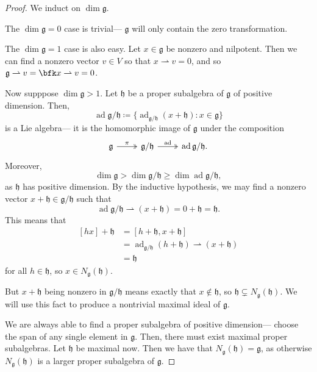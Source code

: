 \documentclass{article}
\newcommand{\lb}[1]{\ensuremath{\left[{#1}\right]}}
\DeclareMathOperator{\ad}{ad}
\newcommand*\frkg{{\ensuremath{\mathfrak{g}}}}
\newcommand*\frkh{{\ensuremath{\mathfrak{h}}}}
\begin{document}
\begin{proof}
    We induct on $\dim \frkg$.

    The $\dim \frkg = 0$ case is trivial--- $\frkg$ will only contain the zero transformation.

    The $\dim \frkg = 1$ case is also easy.
    Let $x \in \frkg$ be nonzero and nilpotent.
    Then  we can find a nonzero vector $v \in V$ so that $x \rightharpoonup v = 0$, and so $\frkg \rightharpoonup v = \bfk x \rightharpoonup v = 0$.

    Now supppose $\dim \frkg > 1$.
    Let $\frkh$ be a proper subalgebra of $\frkg$ of positive dimension.
    Then,
    \[
        \ad \frkg/\frkh
        \coloneq
        \Big\{
            \ad_{\frkg/\frkh}(x + \frkh)
            :
            x \in \frkg
        \Big\}
    \]
    is a Lie algebra--- it is the homomorphic image of $\frkg$ under the composition
    \[
        \begin{tikzcd}
            \frkg \arrow[r, "\pi", two heads] & \frkg/\frkh \arrow[r, "\ad", two heads] & \ad \frkg/\frkh. 
        \end{tikzcd}
    \]
    Moreover, 
    \[
        \dim \frkg > \dim \frkg/\frkh \geq \dim \ad \frkg/\frkh,
    \]
    as $\frkh$ has positive dimension.
    By the inductive hypothesis, we may find a nonzero vector $x + \frkh \in \frkg/\frkh$ such that
    \[
        \ad \frkg/\frkh \rightharpoonup (x + \frkh) 
        = 
        0 + \frkh = \frkh.
    \]
    This means that
    \begin{align*}
        \lb{hx} + \frkh
        &=
        \lb{h + \frkh, x + \frkh}
        \\
        &=
        \ad_{\frkg/\frkh} (h + \frkh) \rightharpoonup (x + \frkh) 
        \\
        &= 
        \frkh
    \end{align*}
    for all $h \in \frkh$, so $x \in N_\frkg(\frkh)$.

    But $x + \frkh$ being nonzero in $\frkg/\frkh$ means exactly that $x \notin \frkh$, so $\frkh \subsetneq N_\frkg(\frkh)$.
    We will use this fact to produce a nontrivial maximal ideal of $\frkg$.

    We are always able to find a proper subalgebra of positive dimension--- choose the span of any single element in $\frkg$. 
    Then, there must exist maximal proper subalgebras. 
    Let $\frkh$ be maximal now. 
    Then we have that $N_\frkg(\frkh) = \frkg$, as otherwise $N_\frkg(\frkh)$ is a larger proper subalgebra of $\frkg$.


\end{proof}
\end{document}
